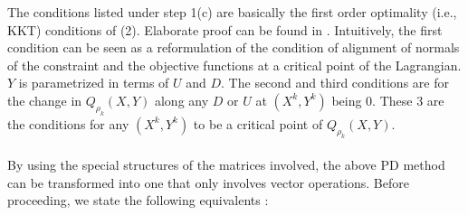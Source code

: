 \documentclass[letterpaper, 10 pt, conference]{article}
\begin{document}
The conditions listed under step 1(c) are basically the first order optimality (i.e., KKT) conditions of (2). Elaborate proof can be found in \cite{PDlong}. Intuitively, the first condition can be seen as a reformulation of the condition of alignment of normals of the constraint and the objective functions at a critical point of the Lagrangian. $Y$ is parametrized in terms of $U$ and $D$. The second and third conditions are for the change in $Q_{\rho_k}(X,Y)$ along any $D$ or $U$ at $(X^k,Y^k)$ being 0. These 3 are the conditions for any $(X^k,Y^k)$ to be a critical point of 
$Q_{\rho_k}(X,Y)$.
\\ \\
By using the special structures of the matrices involved, the above PD method can be transformed into one that only involves vector operations. Before proceeding, we state the following equivalents :
\end{document}
